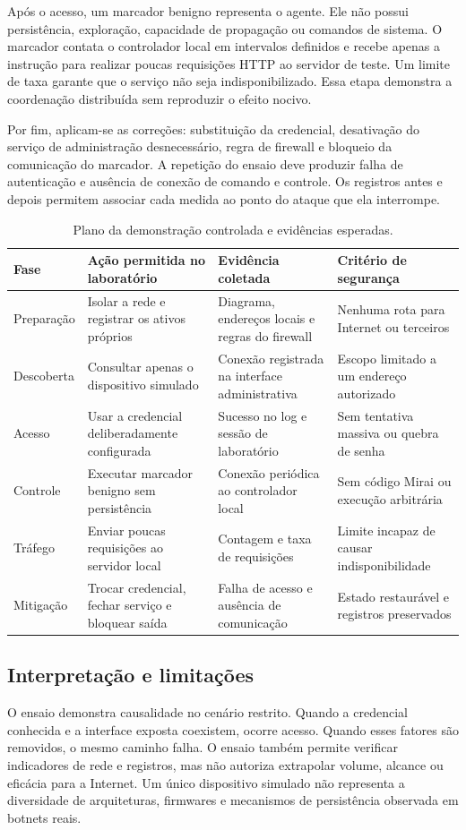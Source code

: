 \documentclass[11pt,a4paper]{article}
\begin{document}
Após o acesso, um marcador benigno representa o agente. Ele não possui persistência, exploração, capacidade de propagação ou comandos de sistema. O marcador contata o controlador local em intervalos definidos e recebe apenas a instrução para realizar poucas requisições HTTP ao servidor de teste. Um limite de taxa garante que o serviço não seja indisponibilizado. Essa etapa demonstra a coordenação distribuída sem reproduzir o efeito nocivo.

Por fim, aplicam-se as correções: substituição da credencial, desativação do serviço de administração desnecessário, regra de firewall e bloqueio da comunicação do marcador. A repetição do ensaio deve produzir falha de autenticação e ausência de conexão de comando e controle. Os registros antes e depois permitem associar cada medida ao ponto do ataque que ela interrompe.

\begin{table}[t]
\centering
\small
\caption{Plano da demonstração controlada e evidências esperadas.}
\label{tab:demonstracao}
\begin{tabularx}{\textwidth}{L{2.6cm}L{4.0cm}YY}
\toprule
Fase & Ação permitida no laboratório & Evidência coletada & Critério de segurança \\
\midrule
Preparação & Isolar a rede e registrar os ativos próprios & Diagrama, endereços locais e regras do firewall & Nenhuma rota para Internet ou terceiros \\
Descoberta & Consultar apenas o dispositivo simulado & Conexão registrada na interface administrativa & Escopo limitado a um endereço autorizado \\
Acesso & Usar a credencial deliberadamente configurada & Sucesso no log e sessão de laboratório & Sem tentativa massiva ou quebra de senha \\
Controle & Executar marcador benigno sem persistência & Conexão periódica ao controlador local & Sem código Mirai ou execução arbitrária \\
Tráfego & Enviar poucas requisições ao servidor local & Contagem e taxa de requisições & Limite incapaz de causar indisponibilidade \\
Mitigação & Trocar credencial, fechar serviço e bloquear saída & Falha de acesso e ausência de comunicação & Estado restaurável e registros preservados \\
\bottomrule
\end{tabularx}
\end{table}

\subsection{Interpretação e limitações}
O ensaio demonstra causalidade no cenário restrito. Quando a credencial conhecida e a interface exposta coexistem, ocorre acesso. Quando esses fatores são removidos, o mesmo caminho falha. O ensaio também permite verificar indicadores de rede e registros, mas não autoriza extrapolar volume, alcance ou eficácia para a Internet. Um único dispositivo simulado não representa a diversidade de arquiteturas, firmwares e mecanismos de persistência observada em botnets reais.
\end{document}
